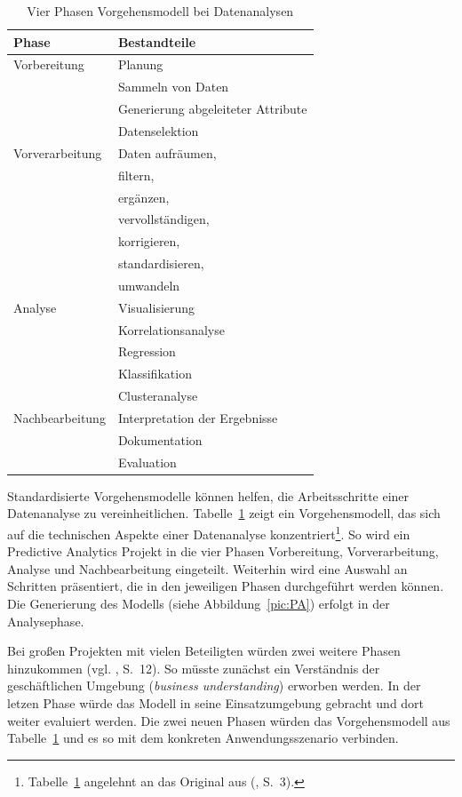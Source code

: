 \begin{table}
\centering
\caption{Vier Phasen Vorgehensmodell bei Datenanalysen}
\label{tab:Vier_Phasen}
\begin{tabular}{ |l|l| }
\hline
\textbf{Phase} & \textbf{Bestandteile} \\
\hline
Vorbereitung & Planung \\
  & Sammeln von Daten \\
  & Generierung abgeleiteter Attribute \\
  & Datenselektion \\
\hline
Vorverarbeitung & Daten aufräumen, \\
  & filtern, \\
  & ergänzen, \\
  & vervollständigen, \\
  & korrigieren, \\
  & standardisieren, \\
  & umwandeln \\
\hline
Analyse & Visualisierung \\
  & Korrelationsanalyse \\
  & Regression \\
  & Klassifikation \\
  & Clusteranalyse \\
\hline
Nachbearbeitung & Interpretation der Ergebnisse \\
  & Dokumentation \\
  & Evaluation \\
\hline
\end{tabular}
\end{table}

Standardisierte Vorgehensmodelle können helfen, die Arbeitsschritte einer
Datenanalyse zu vereinheitlichen. Tabelle~\ref{tab:Vier_Phasen} zeigt ein
Vorgehensmodell, das sich auf die technischen Aspekte einer Datenanalyse
konzentriert\footnote{
Tabelle~\ref{tab:Vier_Phasen} angelehnt an das Original aus (\cite{Runkler}, S.~3).
}. So wird ein Predictive Analytics Projekt in die vier Phasen Vorbereitung,
Vorverarbeitung, Analyse und Nachbearbeitung eingeteilt. Weiterhin wird eine
Auswahl an Schritten präsentiert, die in den jeweiligen Phasen durchgeführt werden
können. Die Generierung des Modells (siehe Abbildung~\ref{pic:PA}) erfolgt in der Analysephase.

Bei großen Projekten mit vielen Beteiligten würden zwei weitere Phasen
hinzukommen (vgl. \cite{crispdm}, S.~12). So müsste zunächst ein Verständnis der
geschäftlichen Umgebung (\emph{business understanding}) erworben werden. In der letzen Phase
würde das Modell in seine Einsatzumgebung gebracht und dort weiter evaluiert werden. Die zwei
neuen Phasen würden das Vorgehensmodell aus Tabelle~\ref{tab:Vier_Phasen} \grqq{}
und es so mit dem konkreten Anwendungsszenario verbinden. 

